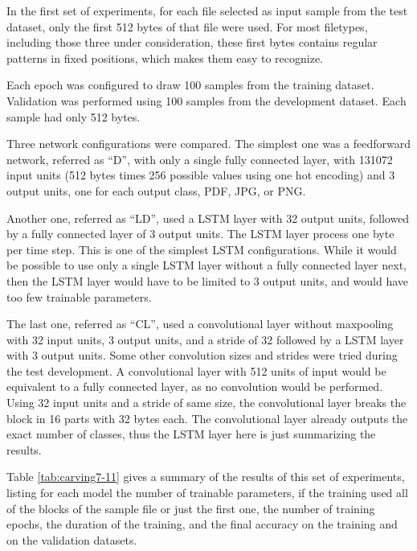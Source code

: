 In the first set of experiments, for each file selected as input sample from the test dataset, only the first 512 bytes of that file were used. For most filetypes, including those three under consideration, these first bytes contains regular patterns in fixed positions, which makes them easy to recognize.

Each epoch was configured to draw 100 samples from the training dataset. Validation was performed using 100 samples from the development dataset. Each sample had only 512 bytes.

Three network configurations were compared. The simplest one was a feedforward network, referred as ``D'', with only a single fully connected layer, with 131072 input units (512 bytes times 256 possible values using one hot encoding) and 3 output units, one for each output class, PDF, JPG, or PNG.

Another one, referred as ``LD'', used a LSTM layer with 32 output units, followed by a fully connected layer of 3 output units. The LSTM layer process one byte per time step. This is one of the simplest LSTM configurations. While it would be possible to use only a single LSTM layer without a fully connected layer next, then the LSTM layer would have to be limited to 3 output units, and would have too few trainable parameters. 

The last one, referred as ``CL'', used a convolutional layer without maxpooling with 32 input units, 3 output units, and a stride of 32 followed by a LSTM layer with 3 output units. Some other convolution sizes and strides were tried during the test development. A convolutional layer with 512 units of input would be equivalent to a fully connected layer, as no convolution would be performed. Using 32 input units and a stride of same size, the convolutional layer breaks the block in 16 parts with 32 bytes each. The convolutional layer already outputs the exact number of classes, thus the LSTM layer here is just summarizing the results.

Table \ref{tab:carving7-11} gives a summary of the results of this set of experiments, listing for each model the number of trainable parameters, if the training used all of the blocks of the sample file or just the first one, the number of training epochs, the duration of the training, and the final accuracy on the training and on the validation datasets.

